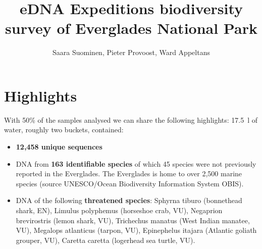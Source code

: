 \documentclass[10pt]{article}
\title{eDNA Expeditions biodiversity survey of Everglades National Park}
\author{Saara Suominen, Pieter Provoost, Ward Appeltans}
\begin{document}

\maketitle

\section*{Highlights}

With 50\% of the samples analysed we can share the following highlights: \SI{17.5}{\litre} of water, roughly two buckets, contained:

\begin{itemize}
\item \textbf{12,458 unique sequences}
\item DNA from \textbf{163 identifiable species} of which 45 species were not previously reported in the Everglades. The Everglades is home to over 2,500 marine species (source UNESCO/Ocean Biodiversity Information System OBIS).
\item DNA of the following \textbf{threatened species}: Sphyrna tiburo (bonnethead shark, EN), Limulus polyphemus (horseshoe crab, VU), Negaprion brevirostris (lemon shark, VU), Trichechus manatus (West Indian manatee, VU), Megalops atlanticus (tarpon, VU), Epinephelus itajara (Atlantic goliath grouper, VU), Caretta caretta (logerhead sea turtle, VU).
\end{itemize}
\end{document}
